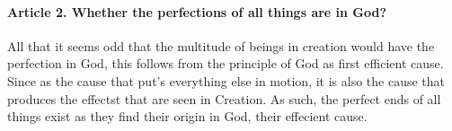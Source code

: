 \documentclass{ucetd}
\begin{document}
\paragraph{Article 2. Whether the perfections of all things are in God?}
All that it seems odd that the multitude of beings in creation would have the perfection in God, this follows from the principle of God as first efficient cause. Since as the cause that put's everything else in motion, it is also the cause that produces the effectst that are seen in Creation. As such, the perfect ends of all things exist as they find their origin in God, their effecient cause. 
\end{document}
